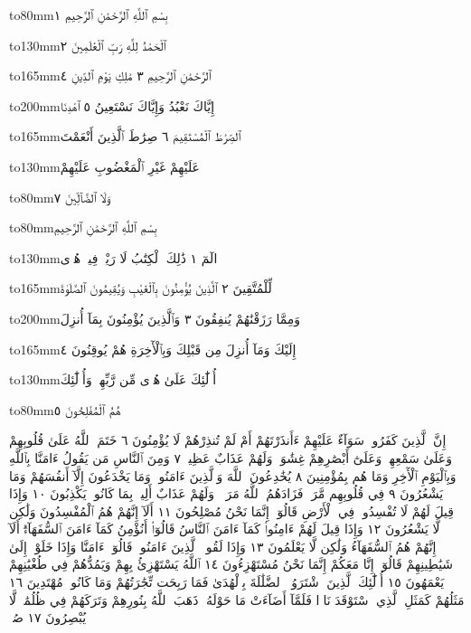 \topglue 50pt
\leavevmode{}\vskip80pt
\centerline{\hbox to80mm{بِسْمِ ٱللَّهِ ٱلرَّحْمَٰنِ ٱلرَّحِيمِ ١}}
\centerline{\hbox to130mm{ٱلْحَمْدُ لِلَّهِ رَبِّ ٱلْعَٰلَمِينَ ٢}}
\centerline{\hbox to165mm{ٱلرَّحْمَٰنِ ٱلرَّحِيمِ ٣ مَٰلِكِ يَوْمِ ٱلدِّينِ ٤}}
\centerline{\hbox to200mm{إِيَّاكَ نَعْبُدُ وَإِيَّاكَ نَسْتَعِينُ ٥ ٱهْدِنَا}}
\centerline{\hbox to165mm{ٱلصِّرَٰطَ ٱلْمُسْتَقِيمَ ٦ صِرَٰطَ ٱلَّذِينَ أَنْعَمْتَ}}
\centerline{\hbox to130mm{عَلَيْهِمْ غَيْرِ ٱلْمَغْضُوبِ عَلَيْهِمْ}}
\centerline{\hbox to80mm{وَلَا ٱلضَّآلِّينَ ٧}}
\vfill
\newpage
\topglue 50pt
\leavevmode{}\vskip80pt
\centerline{\hbox to80mm{بِسْمِ ٱللَّهِ ٱلرَّحْمَٰنِ ٱلرَّحِيمِ}}
\centerline{\hbox to130mm{الٓمٓ ١ ذَٰلِكَ ٱلْكِتَٰبُ لَا رَيْبَۛ فِيهِۛ هُدࣰى}}
\centerline{\hbox to165mm{لِّلْمُتَّقِينَ ٢ ٱلَّذِينَ يُؤْمِنُونَ بِٱلْغَيْبِ وَيُقِيمُونَ ٱلصَّلَوٰةَ}}
\centerline{\hbox to200mm{وَمِمَّا رَزَقْنَٰهُمْ يُنفِقُونَ ٣ وَٱلَّذِينَ يُؤْمِنُونَ بِمَآ أُنزِلَ}}
\centerline{\hbox to165mm{إِلَيْكَ وَمَآ أُنزِلَ مِن قَبْلِكَ وَبِٱلْأٓخِرَةِ هُمْ يُوقِنُونَ ٤}}
\centerline{\hbox to130mm{أُو۟لَٰٓئِكَ عَلَىٰ هُدࣰى مِّن رَّبِّهِمْۖ وَأُو۟لَٰٓئِكَ}}
\centerline{\hbox to80mm{هُمُ ٱلْمُفْلِحُونَ ٥}}
\vfill
\newpage
{}
إِنَّ ٱلَّذِينَ كَفَرُوا۟ سَوَآءٌ عَلَيْهِمْ ءَأَنذَرْتَهُمْ أَمْ لَمْ تُنذِرْهُمْ
لَا يُؤْمِنُونَ ٦ خَتَمَ ٱللَّهُ عَلَىٰ قُلُوبِهِمْ وَعَلَىٰ سَمْعِهِمْۖ وَعَلَىٰٓ
أَبْصَٰرِهِمْ غِشَٰوَةࣱۖ وَلَهُمْ عَذَابٌ عَظِيمࣱ ٧ وَمِنَ ٱلنَّاسِ
مَن يَقُولُ ءَامَنَّا بِٱللَّهِ وَبِٱلْيَوْمِ ٱلْأٓخِرِ وَمَا هُم بِمُؤْمِنِينَ ٨
يُخَٰدِعُونَ ٱللَّهَ وَٱلَّذِينَ ءَامَنُوا۟ وَمَا يَخْدَعُونَ إِلَّآ أَنفُسَهُمْ
وَمَا يَشْعُرُونَ ٩ فِي قُلُوبِهِم مَّرَضࣱ فَزَادَهُمُ ٱللَّهُ مَرَضࣰاۖ
وَلَهُمْ عَذَابٌ أَلِيمُۢ بِمَا كَانُوا۟ يَكْذِبُونَ ١٠ وَإِذَا قِيلَ لَهُمْ
لَا تُفْسِدُوا۟ فِي ٱلْأَرْضِ قَالُوٓا۟ إِنَّمَا نَحْنُ مُصْلِحُونَ ١١ أَلَآ إِنَّهُمْ
هُمُ ٱلْمُفْسِدُونَ وَلَٰكِن لَّا يَشْعُرُونَ ١٢ وَإِذَا قِيلَ لَهُمْ
ءَامِنُوا۟ كَمَآ ءَامَنَ ٱلنَّاسُ قَالُوٓا۟ أَنُؤْمِنُ كَمَآ ءَامَنَ ٱلسُّفَهَآءُۗ
أَلَآ إِنَّهُمْ هُمُ ٱلسُّفَهَآءُ وَلَٰكِن لَّا يَعْلَمُونَ ١٣ وَإِذَا لَقُوا۟
ٱلَّذِينَ ءَامَنُوا۟ قَالُوٓا۟ ءَامَنَّا وَإِذَا خَلَوْا۟ إِلَىٰ شَيَٰطِينِهِمْ قَالُوٓا۟ إِنَّا
مَعَكُمْ إِنَّمَا نَحْنُ مُسْتَهْزِءُونَ ١٤ ٱللَّهُ يَسْتَهْزِئُ بِهِمْ وَيَمُدُّهُمْ
فِي طُغْيَٰنِهِمْ يَعْمَهُونَ ١٥ أُو۟لَٰٓئِكَ ٱلَّذِينَ ٱشْتَرَوُا۟ ٱلضَّلَٰلَةَ
بِٱلْهُدَىٰ فَمَا رَبِحَت تِّجَٰرَتُهُمْ وَمَا كَانُوا۟ مُهْتَدِينَ ١٦
مَثَلُهُمْ كَمَثَلِ ٱلَّذِي ٱسْتَوْقَدَ نَارࣰا فَلَمَّآ أَضَآءَتْ مَا حَوْلَهُۥ
ذَهَبَ ٱللَّهُ بِنُورِهِمْ وَتَرَكَهُمْ فِي ظُلُمَٰتࣲ لَّا يُبْصِرُونَ ١٧ صُمُّۢ
